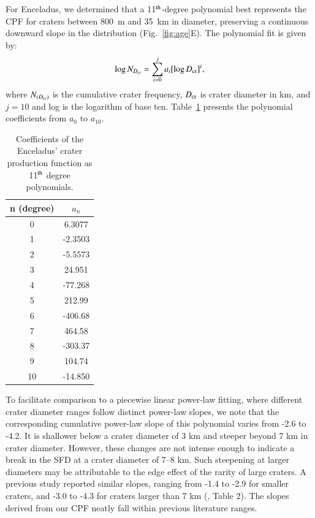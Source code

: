\documentclass[preprint,12pt,3p,times,authoryear]{elsarticle}
\begin{document}
For Enceladus, we determined that a 11$^{\rm th}$-degree polynomial best represents the CPF for craters between 800~m and 35~km in diameter, preserving a continuous downward slope in the distribution (Fig.~\ref{fig:age}E). The polynomial fit is given by:
\begin{equation}
    \log N_{D_{\rm cr}} = \sum_{i=0}^{j} a_{i} [\log D_{\rm cr}]^i,
    \label{equ:cpf}
\end{equation}
where $N_{(D_{\rm cr})}$ is the cumulative crater frequency, $D_{\rm cr}$ is crater diameter in km, and $j = 10$ and log is the logarithm of base ten. Table~\ref{tab:cpf} presents the polynomial coefficients from $a_{0}$ to $a_{10}$.\\
\begin{table}[t]%
\centering
\begin{tabular}{cc}
\hline
\textbf{n (degree)} & \textbf{$a_n$} \\
\hline
0  & 6.3077   \\
1  & -2.3503  \\
2  & -5.5573  \\
3  & 24.951   \\
4  & -77.268  \\
5  & 212.99   \\
6  & -406.68  \\
7  & 464.58   \\
8  & -303.37  \\
9  & 104.74   \\
10 & -14.850  \\
\hline
\end{tabular}
\caption{Coefficients of the Enceladus’ crater production function as 11$^{\rm th}$ degree polynomials.}
\label{tab:cpf}
\end{table}

To facilitate comparison to a piecewise linear power-law fitting, where different crater diameter ranges follow distinct power-law slopes, we note that the corresponding cumulative power-law slope of this polynomial varies from -2.6 to -4.2. It is shallower below a crater diameter of 3 km and steeper beyond 7 km in crater diameter. However, these changes are not intense enough to indicate a break in the SFD at a crater diameter of 7--8 km. Such steepening at larger diameters may be attributable to the edge effect of the rarity of large craters. A previous study reported similar slopes, ranging from -1.4 to -2.9 for smaller craters, and -3.0 to -4.3 for craters larger than 7 km (\citealt{Kirchoff2009}, Table 2). The slopes derived from our CPF neatly fall within previous literature ranges.\\
\end{document}
